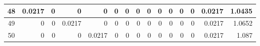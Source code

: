 \begin{table}[hb!]
\begin{adjustbox}{width = \textwidth, center}
\begin{tabular}{|c|r|r|r|r|r|r|r|r|r|r|r|r|r|r|}
        \rowcolor[HTML]{FFFFFF} 
        \cellcolor[HTML]{CFE2F3}48                                  & \cellcolor[HTML]{C7E9D8}0.0217                 & 0                                              & 0                                              & 0                                              & 0                                              & 0                                              & 0                                              & 0                                               & 0                                               & 0                                               & 0                                               & 0                                               & \cellcolor[HTML]{D9D2E9}0.0217                                                  & \cellcolor[HTML]{D9D2E9}1.0435                                                        \\ \hline
        \rowcolor[HTML]{FFFFFF} 
        \cellcolor[HTML]{CFE2F3}49                                  & 0                                              & 0                                              & \cellcolor[HTML]{C7E9D8}0.0217                 & 0                                              & 0                                              & 0                                              & 0                                              & 0                                               & 0                                               & 0                                               & 0                                               & 0                                               & \cellcolor[HTML]{D9D2E9}0.0217                                                  & \cellcolor[HTML]{D9D2E9}1.0652                                                        \\ \hline
        \rowcolor[HTML]{FFFFFF} 
        \cellcolor[HTML]{CFE2F3}50                                  & 0                                              & 0                                              & 0                                              & \cellcolor[HTML]{C7E9D8}0.0217                 & 0                                              & 0                                              & 0                                              & 0                                               & 0                                               & 0                                               & 0                                               & 0                                               & \cellcolor[HTML]{D9D2E9}0.0217                                                  & \cellcolor[HTML]{D9D2E9}1.087                                                         \\ \hline

\end{tabular}
\end{adjustbox}
\end{table}
